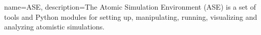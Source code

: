 {
    name={ASE},
    description={The Atomic Simulation Environment (ASE) is a set of tools and Python modules for setting up, 
    manipulating, running, visualizing and analyzing atomistic simulations. \cite{as2017ase}}
}

\printunsrtglossary[itle={List of Packages and Codes tools}]